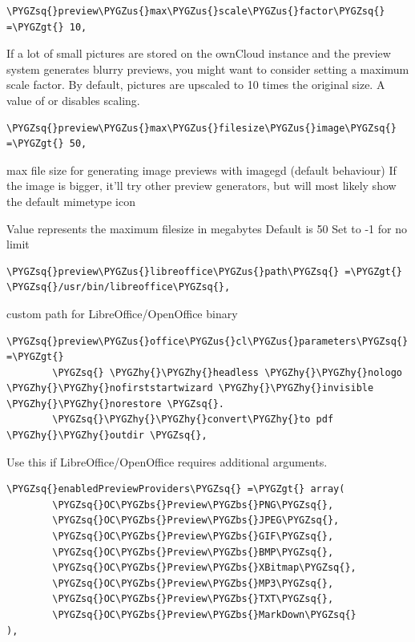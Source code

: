 \documentclass[letterpaper,10pt,english]{sphinxmanual}
\def\PYGZbs{\char`\\}
\def\PYGZus{\char`\_}
\def\PYGZgt{\char`\>}
\def\PYGZhy{\char`\-}
\def\PYGZsq{\char`\'}
\renewcommand\PYGZsq{\textquotesingle}
\begin{document}
\begin{Verbatim}[commandchars=\\\{\}]
\PYGZsq{}preview\PYGZus{}max\PYGZus{}scale\PYGZus{}factor\PYGZsq{} =\PYGZgt{} 10,
\end{Verbatim}

If a lot of small pictures are stored on the ownCloud instance and the
preview system generates blurry previews, you might want to consider setting
a maximum scale factor. By default, pictures are upscaled to 10 times the
original size. A value of  or  disables scaling.

\begin{Verbatim}[commandchars=\\\{\}]
\PYGZsq{}preview\PYGZus{}max\PYGZus{}filesize\PYGZus{}image\PYGZsq{} =\PYGZgt{} 50,
\end{Verbatim}

max file size for generating image previews with imagegd (default behaviour)
If the image is bigger, it'll try other preview generators,
but will most likely show the default mimetype icon

Value represents the maximum filesize in megabytes
Default is 50
Set to -1 for no limit

\begin{Verbatim}[commandchars=\\\{\}]
\PYGZsq{}preview\PYGZus{}libreoffice\PYGZus{}path\PYGZsq{} =\PYGZgt{} \PYGZsq{}/usr/bin/libreoffice\PYGZsq{},
\end{Verbatim}

custom path for LibreOffice/OpenOffice binary

\begin{Verbatim}[commandchars=\\\{\}]
\PYGZsq{}preview\PYGZus{}office\PYGZus{}cl\PYGZus{}parameters\PYGZsq{} =\PYGZgt{}
        \PYGZsq{} \PYGZhy{}\PYGZhy{}headless \PYGZhy{}\PYGZhy{}nologo \PYGZhy{}\PYGZhy{}nofirststartwizard \PYGZhy{}\PYGZhy{}invisible \PYGZhy{}\PYGZhy{}norestore \PYGZsq{}.
        \PYGZsq{}\PYGZhy{}\PYGZhy{}convert\PYGZhy{}to pdf \PYGZhy{}\PYGZhy{}outdir \PYGZsq{},
\end{Verbatim}

Use this if LibreOffice/OpenOffice requires additional arguments.

\begin{Verbatim}[commandchars=\\\{\}]
\PYGZsq{}enabledPreviewProviders\PYGZsq{} =\PYGZgt{} array(
        \PYGZsq{}OC\PYGZbs{}Preview\PYGZbs{}PNG\PYGZsq{},
        \PYGZsq{}OC\PYGZbs{}Preview\PYGZbs{}JPEG\PYGZsq{},
        \PYGZsq{}OC\PYGZbs{}Preview\PYGZbs{}GIF\PYGZsq{},
        \PYGZsq{}OC\PYGZbs{}Preview\PYGZbs{}BMP\PYGZsq{},
        \PYGZsq{}OC\PYGZbs{}Preview\PYGZbs{}XBitmap\PYGZsq{},
        \PYGZsq{}OC\PYGZbs{}Preview\PYGZbs{}MP3\PYGZsq{},
        \PYGZsq{}OC\PYGZbs{}Preview\PYGZbs{}TXT\PYGZsq{},
        \PYGZsq{}OC\PYGZbs{}Preview\PYGZbs{}MarkDown\PYGZsq{}
),
\end{Verbatim}
\end{document}

